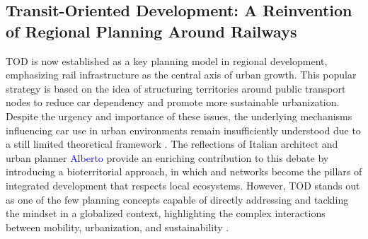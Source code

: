 \begin{refsegment}
\newpage
{} %
\section{Transit-Oriented Development: A Reinvention of Regional Planning Around Railways
    \label{chap1:tod-presentation-generale}
    }

\acrshort{TOD} is now established as a key planning model in regional development, emphasizing rail infrastructure as the central axis of urban growth. This popular strategy is based on the idea of structuring territories around public transport nodes to reduce car dependency and promote more sustainable urbanization. Despite the urgency and importance of these issues, the underlying mechanisms influencing car use in urban environments remain insufficiently understood due to a still limited theoretical framework \textcolor{blue}{\autocite[1]{verbavatz_critical_2019}}. The reflections of Italian architect and urban planner \textcolor{blue}{Alberto} \textcolor{blue}{\textcite[]{magnaghi_bioregion_2014}} provide an enriching contribution to this debate by introducing a bioterritorial approach, in which  and networks become the pillars of integrated development that respects local ecosystems. However, \acrshort{TOD} stands out as one of the few planning concepts capable of directly addressing and tackling the  mindset \textcolor{blue}{\autocite[]{dupuy_urbanisme_1991}} in a globalized context, highlighting the complex interactions between mobility, urbanization, and sustainability \textcolor{blue}{\autocite[51]{el_hadeuf_ville_2017}}.%


\end{refsegment}

